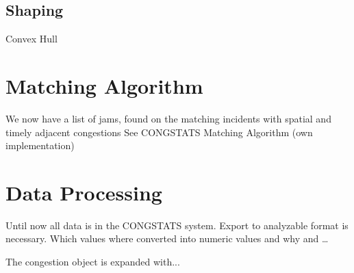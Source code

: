 \documentclass[a4paper,headsepline,footsepline,fontsize=11pt,BCOR=12mm,DIV=12]{report}
\begin{document}
\subsection{Shaping}
\label{methodology_shaping}

Convex Hull
\begin{figure}[h]
	\centering
\end{figure}


\section{Matching Algorithm}
\label{methodology_matching}
We now have a list of jams, found on the matching incidents with spatial and timely adjacent congestions
See CONGSTATS Matching Algorithm (own implementation)

\section{Data Processing}
\label{methodology_data_processing}
Until now all data is in the CONGSTATS system. Export to analyzable format is necessary.
Which values where converted into numeric values and why and …


The congestion object is expanded with...
\end{document}
